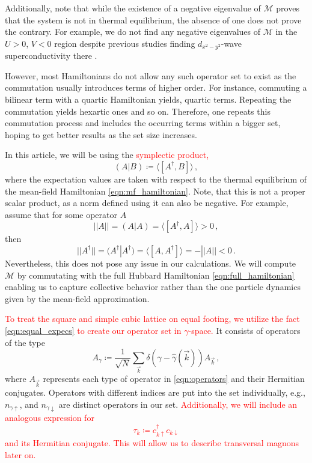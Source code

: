 \documentclass[
    reprint, 
    aps,
    preprintnumbers,
    twocolumn,
    prb,
    superscriptaddress
]{revtex4-2}
\newcommand{\vk}{\vec{k}}
\newcommand{\up}{\uparrow}
\newcommand{\down}{\downarrow}
\newcommand{\mM}{\mathcal{M}}
\newcommand{\markEdited}{red}
\begin{document}
Additionally, note that while the existence of a negative eigenvalue of $\mM$ proves that the system is not in thermal equilibrium, the absence of one does not prove the contrary.
For example, we do not find any negative eigenvalues of $\mM$ in the $U>0$, $V<0$ region despite previous studies finding $d_{x^2 - y^2}$-wave superconductivity there \cite{Micnas88b,Huang13}.

However, most Hamiltonians do not allow any such operator set to exist as the commutation usually introduces terms of higher order.
For instance, commuting a bilinear term with a quartic Hamiltonian yields, quartic terms. Repeating the commutation yields hexartic ones and so on.
Therefore, one repeats this commutation process and includes the occurring terms within a bigger set,
hoping to get better results as the set size increases.

In this article, we will be using the \textcolor{\markEdited}{symplectic product,}
\begin{equation}
\label{eqn:scalar_product}
    (A | B) \coloneqq  \langle [A^\dagger, B] \rangle\,,
\end{equation}
where the expectation values are taken with respect to the thermal equilibrium of the mean-field Hamiltonian \eqref{eqn:mf_hamiltonian}.
Note, that this is not a proper scalar product, as a norm defined using it can also be negative.
For example, assume that for some operator $A$
\begin{equation}
    ||A|| = (A | A) = \langle [A^\dagger, A] \rangle > 0\,,
\end{equation}
then
\begin{equation}
    ||A^\dagger|| = (A^\dagger | A^\dagger) = \langle [A, A^\dagger] \rangle = - ||A|| < 0\,.
\end{equation}
Nevertheless, this does not pose any issue in our calculations.
We will compute $\mM$ by commutating with the full Hubbard Hamiltonian \eqref{eqn:full_hamiltonian} enabling us to capture collective behavior rather than the one particle dynamics given by the mean-field approximation.

\textcolor{\markEdited}{To treat the square and simple cubic lattice on equal footing, we utilize the fact \eqref{eqn:equal_expecs} to create our operator set in $\gamma$-space.}
It consists of operators of the type
\begin{equation}
    \label{eqn:ieom_basis_operator}
    A_\gamma \coloneqq \frac{1}{\sqrt{N}} \sum_{\vk} \delta (\gamma - \hat{\gamma}( \vk )) A_{\vk}\,,
\end{equation}
where $A_{\vk}$ represents each type of operator in \eqref{eqn:operators} and their Hermitian conjugates.
Operators with different indices are put into the set individually, e.g., $n_{\gamma \up}$, and $n_{\gamma \down}$ are distinct operators in our set.
\textcolor{\markEdited}{Additionally, we will include an analogous expression for
\begin{equation}
    \tau_{k} \coloneqq c_{k \uparrow}^\dagger c_{k \downarrow}
\end{equation}
and its Hermitian conjugate.
This will allow us to describe transversal magnons later on.}
\end{document}
